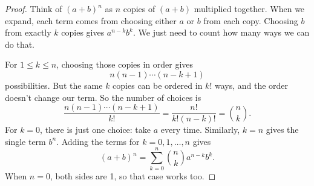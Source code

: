 \begin{proof}
Think of $(a+b)^n$ as $n$ copies of $(a+b)$ multiplied together.
When we expand, each term comes from choosing either $a$ or $b$
from each copy. Choosing $b$ from exactly $k$ copies gives
$a^{n-k}b^k$. We just need to count how many ways we can do that.

For $1\leq k\leq n$, choosing those copies in order gives
$$n(n-1)\cdots(n-k+1)$$
possibilities. But the same $k$ copies can be ordered in $k!$ ways,
and the order doesn't change our term. So the number of choices is
$$\frac{n(n-1)\cdots(n-k+1)}{k!}
=\frac{n!}{k!(n-k)!}=\binom nk.$$
For $k=0$, there is just one choice: take $a$ every time.
Similarly, $k=n$ gives the single term $b^n$.
Adding the terms for $k=0,1,\ldots,n$ gives
$$ (a+b)^n=\sum_{k=0}^n\binom nk a^{n-k}b^k.$$
When $n=0$, both sides are 1, so that case works too.
\end{proof}



